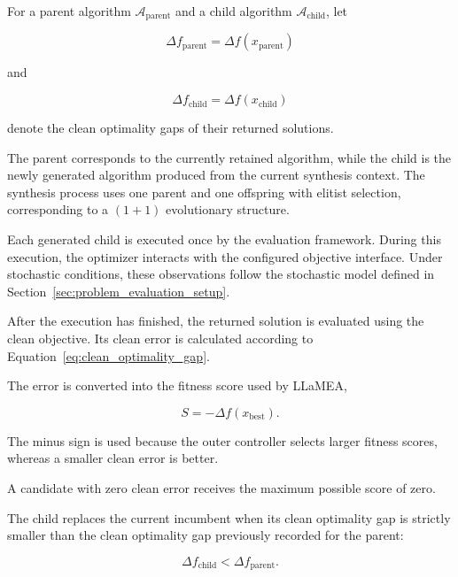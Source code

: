 For a parent algorithm $\mathcal{A}_{\mathrm{parent}}$ and a child algorithm
$\mathcal{A}_{\mathrm{child}}$, let

\begin{equation}
\Delta f_{\mathrm{parent}}
=
\Delta f(x_{\mathrm{parent}})
\end{equation}

and

\begin{equation}
\Delta f_{\mathrm{child}}
=
\Delta f(x_{\mathrm{child}})
\end{equation}

denote the clean optimality gaps of their returned solutions.

The parent corresponds to the currently retained algorithm, while the child
is the newly generated algorithm produced from the current synthesis context.
The synthesis process uses one parent and one offspring with elitist
selection, corresponding to a $(1+1)$ evolutionary structure.

Each generated child is executed once by the evaluation framework. During
this execution, the optimizer interacts with the configured objective
interface. Under stochastic conditions, these observations follow the
stochastic model defined in
Section~\ref{sec:problem_evaluation_setup}.

After the execution has finished, the returned solution is evaluated using the
clean objective. Its clean error is calculated according to
Equation~\ref{eq:clean_optimality_gap}.

The error is converted into the fitness score used by LLaMEA,

\begin{equation}
S = -\Delta f(x_{\mathrm{best}}).
\label{eq:synthesis_fitness_score}
\end{equation}

The minus sign is used because the outer controller selects larger fitness
scores, whereas a smaller clean error is better.

A candidate with zero clean error receives the maximum possible score of
zero.

The child replaces the current incumbent when its clean optimality gap is
strictly smaller than the clean optimality gap previously recorded for the
parent:

\begin{equation}
\Delta f_{\mathrm{child}}
<
\Delta f_{\mathrm{parent}}.
\label{eq:child_replacement_condition}
\end{equation}

